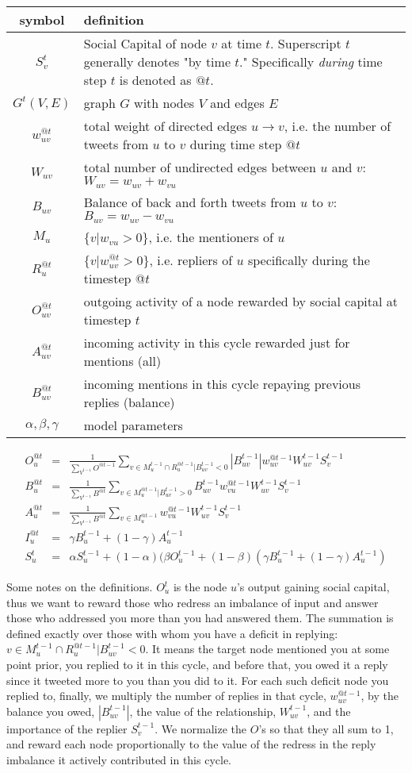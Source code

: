 \documentclass[10pt,oneside]{memoir}
\begin{document}
\begin{tabular}{|c|p{4in}|}
\hline 
symbol & definition\tabularnewline
\hline
\hline 
$S_{v}^{t}$ & Social Capital of node $v$ at time $t$. Superscript $t$ generally
denotes "by time $t$." Specifically \emph{during} time step
$t$ is denoted as $@t$.\tabularnewline
\hline 
$G^{t}(V,E)$ & graph $G$ with nodes $V$ and edges $E$\tabularnewline
\hline 
$w_{uv}^{@t}$ & total weight of directed edges $u\rightarrow v$, i.e. the number
of tweets from $u$ to $v$ during time step $@t$\tabularnewline
\hline 
$W_{uv}$ & total number of undirected edges between $u$ and $v$: $W_{uv}=w_{uv}+w_{vu}$\tabularnewline
\hline 
$B_{uv}$ & Balance of back and forth tweets from $u$ to $v$: $B_{uv}=w_{uv}-w_{vu}$\tabularnewline
\hline 
$M_{u}$ & $\{v|w_{vu}>0\}$, i.e. the mentioners of $u$\tabularnewline
\hline 
$R_{u}^{@t}$ & $\{v|w_{uv}^{@t}>0\}$, i.e. repliers of $u$ specifically during
the timestep @$t$\tabularnewline
\hline 
$O_{uv}^{@t}$ & outgoing activity of a node rewarded by social capital at timestep
$t$\tabularnewline
\hline 
$A_{uv}^{@t}$ & incoming activity in this cycle rewarded just for mentions (all)\tabularnewline
\hline 
$B_{uv}^{@t}$ & incoming mentions in this cycle repaying previous replies (balance)\tabularnewline
\hline 
$\alpha,\beta,\gamma$ & model parameters\tabularnewline
\hline
\end{tabular}
\begin{eqnarray}
O_{u}^{@t} & = & \frac{1}{\sum_{V^{t-1}}O^{@t-1}}\sum_{v\in M_{u}^{t-1}\cap R_{u}^{@t-1}|B_{uv}^{t-1}<0}|B_{uv}^{t-1}|w_{uv}^{@t-1}W_{uv}^{t-1}S_{v}^{t-1}\\
B_{u}^{@t} & = & \frac{1}{\sum_{V^{t-1}}B^{@t}}\sum_{v\in M_{u}^{@t-1}|B_{uv}^{t-1}>0}B_{uv}^{t-1}w_{vu}^{@t-1}W_{uv}^{t-1}S_{v}^{t-1}\\
A_{u}^{@t} & = & \frac{1}{\sum_{V^{t-1}}B^{@t}}\sum_{v\in M_{u}^{@t-1}}w_{vu}^{@t-1}W_{uv}^{t-1}S_{v}^{t-1}\\
I_{u}^{@t} & = & \gamma B_{u}^{t-1}+(1-\gamma)A_{u}^{t-1}\\
S_{u}^{t} & = & \alpha S_{u}^{t-1}+(1-\alpha)(\beta O_{u}^{t-1}+(1-\beta)(\gamma B_{u}^{t-1}+(1-\gamma)A_{u}^{t-1})
\end{eqnarray}

Some notes on the definitions. $O_{u}^{t}$ is the node $u$'s output gaining social capital, thus we want to reward those who redress an imbalance of input and answer those who addressed you more than you had answered them. The summation is defined exactly over those with whom you have a deficit in replying: $v\in M_{u}^{t-1}\cap R_{u}^{@t-1}|B_{uv}^{t-1}<0$. It means the target node mentioned you at some point prior, you replied to it in this cycle, and before that, you owed it a reply since it tweeted more to you than you did to it. For each such deficit node you replied to, finally, we multiply the number of replies in that cycle, $w_{uv}^{@t-1}$, by the balance you owed, $|B_{uv}^{t-1}|$, the value of the relationship, $W_{uv}^{t-1}$, and the importance of the replier $S_{v}^{t-1}$. We normalize the $O$'s so that they all sum to 1, and reward each node proportionally to the value of the redress in the reply imbalance it actively contributed in this cycle.
\end{document}
